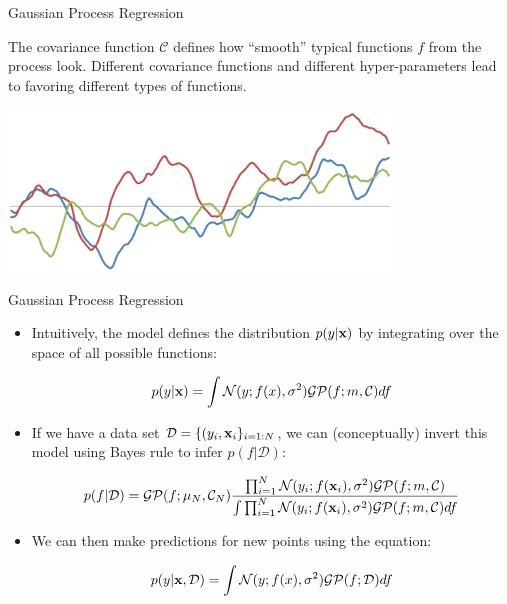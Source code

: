 \documentclass[serif,xcolor=pdftex,dvipsnames,table,hyperref={bookmarks=false,breaklinks}]{beamer}
\begin{document}
\begin{frame}[t]{Gaussian Process Regression}

The covariance function $\mathcal{C}$ defines how ``smooth'' typical
functions $f$ from the process look. Different covariance functions
and different hyper-parameters lead to favoring different types of functions.

\includegraphics[width=4in]{../Figures/GPsamples2.png}

\end{frame}

\begin{frame}[t]{Gaussian Process Regression}

\begin{itemize}
\item Intuitively, the model defines the distribution $p(y|{\mathbf{x}})$ by 
integrating over the space of all possible functions:

\pause
$$p(y|{\mathbf{x}}) = \int 
\mathcal{N}(y;f(x),\sigma^2)\mathcal{GP}(f;m,\mathcal{C})df$$

\pause\item If we have a data set 
$\mathcal{D}=\{(y_i,{\mathbf{x}}_i\}_{i=1:N}$, we can (conceptually) invert this 
model using Bayes rule to infer $p(f|\mathcal{D})$:

$$p(f|\mathcal{D}) = \mathcal{GP}(f;\mu_N,\mathcal{C}_N)\frac{\prod_{i=1}^N 
\mathcal{N}(y_i;f({\mathbf{x}}_i),\sigma^2)\mathcal{GP}(f;m,\mathcal{C})}
{\int \prod_{i=1}^N
\mathcal{N}(y_i;f({\mathbf{x}}_i),\sigma^2)\mathcal{GP}(f;m,\mathcal{C})df}
$$

\pause\item We can then make predictions for new points using the equation:

$$p(y|{\mathbf{x}},\mathcal{D}) = \int 
\mathcal{N}(y;f(x),\sigma^2)\mathcal{GP}(f;\mathcal{D})df$$

\end{itemize}

\end{frame}
\end{document}
